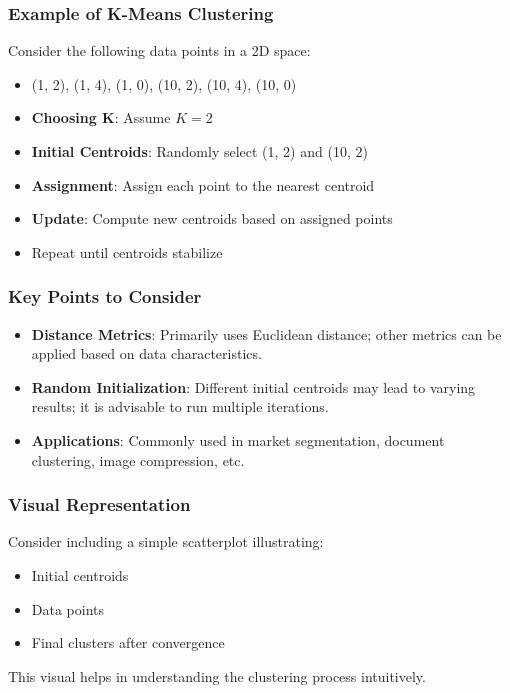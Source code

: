 \documentclass{beamer}
\begin{document}
\begin{frame}[fragile]
    \frametitle{Example of K-Means Clustering}
    Consider the following data points in a 2D space:
    \begin{itemize}
        \item (1, 2), (1, 4), (1, 0), (10, 2), (10, 4), (10, 0)
    \end{itemize}
    \begin{itemize}
        \item \textbf{Choosing K}: Assume \(K=2\)
        \item \textbf{Initial Centroids}: Randomly select (1, 2) and (10, 2)
        \item \textbf{Assignment}: Assign each point to the nearest centroid
        \item \textbf{Update}: Compute new centroids based on assigned points
        \item Repeat until centroids stabilize
    \end{itemize}
\end{frame}

\begin{frame}[fragile]
    \frametitle{Key Points to Consider}
    \begin{itemize}
        \item \textbf{Distance Metrics}: Primarily uses Euclidean distance; other metrics can be applied based on data characteristics.
        \item \textbf{Random Initialization}: Different initial centroids may lead to varying results; it is advisable to run multiple iterations.
        \item \textbf{Applications}: Commonly used in market segmentation, document clustering, image compression, etc.
    \end{itemize}
\end{frame}

\begin{frame}[fragile]
    \frametitle{Visual Representation}
    Consider including a simple scatterplot illustrating:
    \begin{itemize}
        \item Initial centroids
        \item Data points
        \item Final clusters after convergence
    \end{itemize}
    This visual helps in understanding the clustering process intuitively.
\end{frame}
\end{document}

